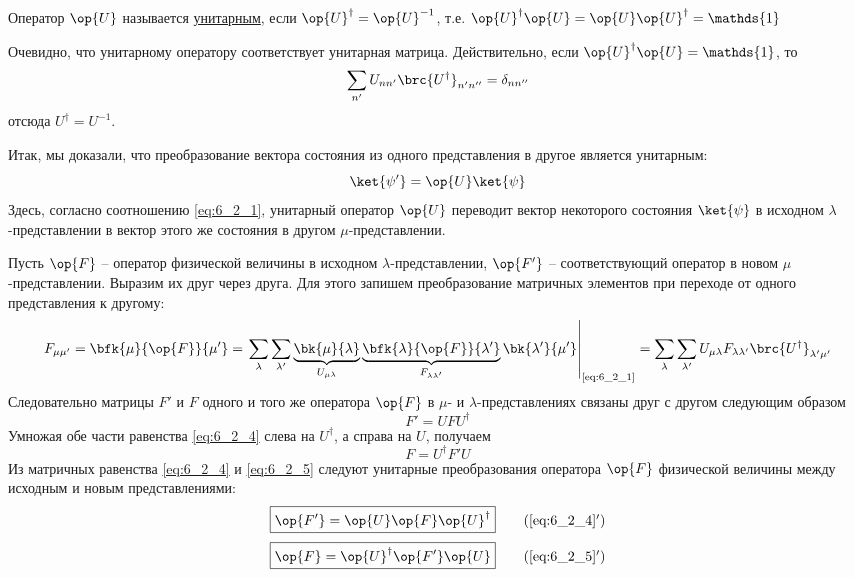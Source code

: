 \begin{defn}
Оператор $\op{U}$ называется \underline{унитарным}, если $\op{U}^\dag = \op{U}^{-1}$, т.е. $\op{U}^\dag\op{U}= \op{U}\op{U}^\dag= \mathds{1}$
\end{defn}

Очевидно, что унитарному оператору соответствует унитарная матрица. Действительно, если $\op{U}^\dag\op{U}=\mathds{1}$, то%
%
$$
\sum_{n'}U_{nn'} \brc{U^\dag}_{n'n''}=\delta_{nn''}
$$%
%
отсюда $U^\dag=U^{-1}$.

Итак, мы доказали, что преобразование вектора состояния из одного представления в другое является унитарным:
\begin{equation}
\label{eq:6_2_2}
\ket{\psi'}=\op{U}\ket{\psi}
\end{equation}%
%
Здесь, согласно соотношению \eqref{eq:6_2_1}, унитарный оператор $\op{U}$ переводит вектор некоторого состояния $\ket{\psi}$ в исходном $\lambda$-представлении в вектор этого же состояния в другом $\mu$-представлении.

Пусть $\op{F}$ -- оператор физической величины в исходном $\lambda$-представлении, $\op{F'}$ -- соответствующий оператор в новом $\mu$-представлении. Выразим их друг через друга. Для этого запишем преобразование матричных элементов при переходе от одного представления к другому:%
%
\begin{equation}
\label{eq:6_2_3}
F_{\mu\mu'} =  \bfk{\mu}{\op{F}}{\mu'} = \left.
	\sum_\lambda \sum_{\lambda'} 
		\underbrace{\bk{\mu}{\lambda}}_{U_{\mu\lambda}}
		\underbrace{\bfk{\lambda}{\op{F}}{\lambda'}}_{F_{\lambda\lambda'}}
		\bk{\lambda'}{\mu'} \right|_{\text{\eqref{eq:6_2_1}}} =
	\sum_\lambda \sum_{\lambda'} U_{\mu\lambda} F_{\lambda\lambda'} \brc{U^\dag}_{\lambda'\mu'}
\end{equation}%
%
Следовательно матрицы $F'$ и $F$ одного и того же оператора $\op{F}$ в $\mu$- и $\lambda$-представлениях связаны друг с другом следующим образом%
\begin{equation}
\label{eq:6_2_4}
\boxed{F'=U F U^\dag}
\end{equation}%
%
Умножая обе части равенства \eqref{eq:6_2_4} слева на $U^\dag$, а справа на $U$, получаем%
\begin{equation}
\label{eq:6_2_5}
\boxed{F=U^\dag F' U}
\end{equation}%
%
Из матричных равенства \eqref{eq:6_2_4} и \eqref{eq:6_2_5} следуют унитарные преобразования оператора $\op{F}$ физической величины между исходным и новым представлениями:%
%
\begin{equation}
\label{eq:6_2_4_add}
\boxed{\op{F'}=\op{U} \op{F} \op{U}^\dag}
\tag{\ref{eq:6_2_4}$'$}
\end{equation}%
%
\begin{equation}
\label{eq:6_2_5_add}
\boxed{\op{F}=\op{U}^\dag \op{F'} \op{U}}
\tag{\ref{eq:6_2_5}$'$}
\end{equation}%

